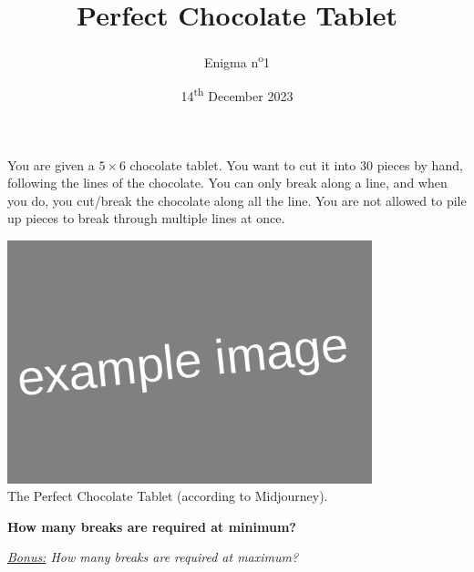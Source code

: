 \documentclass[a4paper, top=10mm]{article}
\title{\textbf{\huge{Perfect Chocolate Tablet}}}
\author{Enigma n\textsuperscript{o}1}
\date{14\textsuperscript{th} December 2023}
\begin{document}
	\maketitle
	
	You are given a $5 \times 6$ chocolate tablet.
	You want to cut it into $30$ pieces by hand, following the lines of the chocolate.
	You can only break along a line, and when you do, you cut/break the chocolate along all the line.
	You are not allowed to pile up pieces to break through multiple lines at once.
	
	\begin{center}
		\includegraphics[height=200pt]{00example.png}\\
		The Perfect Chocolate Tablet (according to Midjourney).
	\end{center}
	
	\textbf{How many breaks are required at minimum?}
	
	\vspace{2cm}
	
	\textit{\underline{Bonus:} How many breaks are required at maximum?}
	
\end{document}
